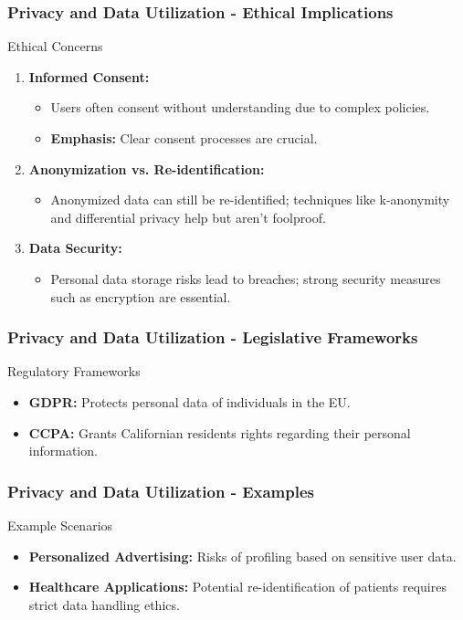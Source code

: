 \documentclass[aspectratio=169]{beamer}
\begin{document}
\begin{frame}[fragile]
    \frametitle{Privacy and Data Utilization - Ethical Implications}
    \begin{block}{Ethical Concerns}
        \begin{enumerate}
            \item \textbf{Informed Consent:}
                \begin{itemize}
                    \item Users often consent without understanding due to complex policies.
                    \item \textbf{Emphasis:} Clear consent processes are crucial.
                \end{itemize}
            \item \textbf{Anonymization vs. Re-identification:}
                \begin{itemize}
                    \item Anonymized data can still be re-identified; techniques like k-anonymity and differential privacy help but aren't foolproof.
                \end{itemize}
            \item \textbf{Data Security:}
                \begin{itemize}
                    \item Personal data storage risks lead to breaches; strong security measures such as encryption are essential.
                \end{itemize}
        \end{enumerate}
    \end{block}
\end{frame}

\begin{frame}[fragile]
    \frametitle{Privacy and Data Utilization - Legislative Frameworks}
    \begin{block}{Regulatory Frameworks}
        \begin{itemize}
            \item \textbf{GDPR:} Protects personal data of individuals in the EU.
            \item \textbf{CCPA:} Grants Californian residents rights regarding their personal information.
        \end{itemize}
    \end{block}
\end{frame}

\begin{frame}[fragile]
    \frametitle{Privacy and Data Utilization - Examples}
    \begin{block}{Example Scenarios}
        \begin{itemize}
            \item \textbf{Personalized Advertising:} Risks of profiling based on sensitive user data.
            \item \textbf{Healthcare Applications:} Potential re-identification of patients requires strict data handling ethics.
        \end{itemize}
    \end{block}
\end{frame}
\end{document}
